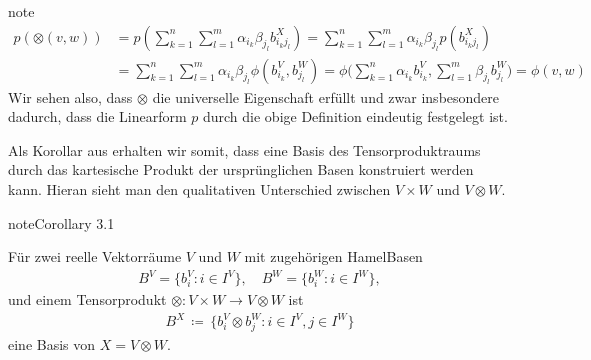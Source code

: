 \documentclass[letterpaper,10pt,german]{jupyterBook}
\begin{document}
\begin{sphinxadmonition}{note}
\begin{equation*}
\begin{split}p(\otimes(v,w))
&= p \left( \sum_{k=1}^n \sum_{l=1}^m \alpha_{i_k} \beta_{j_l} b_{i_kj_l}^X \right)
= \sum_{k=1}^n \sum_{l=1}^m \alpha_{i_k} \beta_{j_l} p(b_{i_kj_l}^X) \\
&= \sum_{k=1}^n \sum_{l=1}^m \alpha_{i_k} \beta_{j_l} \phi\left(b_{i_k}^V, b_{j_l}^W\right)
= \phi\big(\sum_{k=1}^n \alpha_{i_k} b_{i_k}^V,\sum_{l=1}^m \beta_{j_l} b_{j_l}^W\big)
= \phi(v,w)\end{split}
\end{equation*}
\sphinxAtStartPar
Wir sehen also, dass \(\otimes\) die universelle Eigenschaft erfüllt und zwar insbesondere dadurch, dass die Linearform \(p\) durch die obige Definition eindeutig festgelegt ist.
\end{sphinxadmonition}

\sphinxAtStartPar
Als Korollar aus {\hyperref[\detokenize{vektoranalysis/tensor:thm:existenzTensorprodukt}]{}} erhalten wir somit, dass eine Basis des Tensorproduktraums durch das kartesische Produkt der ursprünglichen Basen konstruiert werden kann.
Hieran sieht man den qualitativen Unterschied zwischen \(V \times W\) und \(V\otimes W\).
\label{vektoranalysis/tensor:corollary-6}
\begin{sphinxadmonition}{note}{Corollary 3.1}



\sphinxAtStartPar
Für zwei reelle Vektorräume \(V\) und \(W\) mit zugehörigen Hamel\sphinxhyphen{}Basen
\begin{equation*}
\begin{split}B^V = \{b_i^V: i\in I^V\}, \quad B^W = \{b_i^W: i\in I^W\},\end{split}
\end{equation*}
\sphinxAtStartPar
und einem Tensorprodukt \(\otimes:V\times W \to V\otimes W\) ist
\begin{equation*}
\begin{split}B^X \, \coloneqq \, \{b_i^V \otimes b_j^W: i\in I^V, j\in I^W\}\end{split}
\end{equation*}
\sphinxAtStartPar
eine Basis von \(X = V\otimes W\).
\end{sphinxadmonition}
\end{document}
